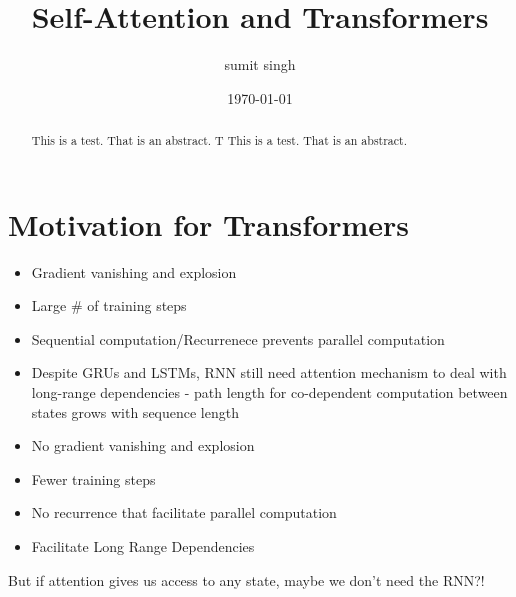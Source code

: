 \documentclass{article}
\title{Self-Attention and Transformers}
\author{sumit singh}
\date{\today}
\begin{document}
\maketitle
\begin{abstract}
\noindent
This is a test. That is an abstract.  T This is a test. That is an abstract. 

\end{abstract}

\hspace{0.5in}
\section{Motivation for Transformers}
\begin{tcbraster}[raster columns=2,raster equal height,nobeforeafter,raster column skip=0.5cm]
  \begin{tcolorbox}[title=Challenges with RNNs]
    \begin{itemize}
    \item Gradient vanishing and explosion
    \item Large \# of training steps
    \item Sequential computation/Recurrenece prevents parallel computation
    \item Despite GRUs and LSTMs, RNN still need attention mechanism to deal with long-range dependencies - path length for co-dependent computation between states grows with sequence length
\end{itemize}
  \end{tcolorbox}
  \begin{tcolorbox}[title=Transformer Networks]
    \begin{itemize}
    
    \item No gradient vanishing and explosion
    \item Fewer training steps
    \item No recurrence that facilitate parallel computation
    \item Facilitate Long Range Dependencies
\end{itemize}
  \end{tcolorbox}
\end{tcbraster}
But if attention gives us access to any state, maybe we don't need the RNN?!
\end{document}

